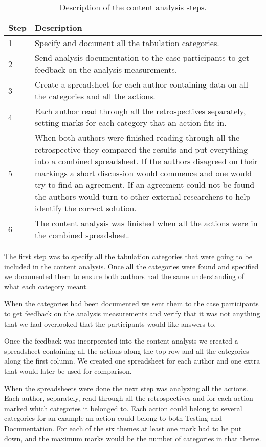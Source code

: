 \begin{table}
	\begin{centering}
		\caption{Description of the content analysis steps.}
		\label{table:content-analysis-steps}
		\begin{tabular}{l p{}}
			Step & Description \\ 
			\hline
			1 & Specify and document all the tabulation categories. \\
			2 & Send analysis documentation to the case participants to get feedback on the analysis measurements. \\
			3 & Create a spreadsheet for each author containing data on all the categories and all the actions. \\
			4 & Each author read through all the retrospectives separately, setting marks for each category that an action fits in. \\
			5 & When both authors were finished reading through all the retrospective they compared the results and put everything into a combined spreadsheet. If the authors disagreed on their markings a short discussion would commence and one would try to find an agreement. If an agreement could not be found the authors would turn to other external researchers to help identify the correct solution. \\
			6 & The content analysis was finished when all the actions were in the combined spreadsheet. \\
		\end{tabular}
	\end{centering}
\end{table}

The first step was to specify all the tabulation categories that were going to be included in the content analysis. Once all the categories were found and specified we documented them to ensure both authors had the same understanding of what each category meant. 

When the categories had been documented we sent them to the case participants to get feedback on the analysis measurements and verify that it was not anything that we had overlooked that the participants would like answers to. 

Once the feedback was incorporated into the content analysis we created a spreadsheet containing all the actions along the top row and all the categories along the first column. We created one spreadsheet for each author and one extra that would later be used for comparison. 

When the spreadsheets were done the next step was analyzing all the actions. Each author, separately, read through all the retrospectives and for each action marked which categories it belonged to. Each action could belong to several categories for an example an action could belong to both Testing and Documentation. For each of the six themes at least one mark had to be put down, and the maximum marks would be the number of categories in that theme. 

